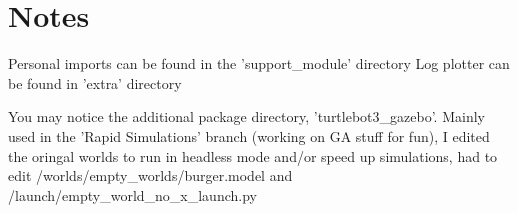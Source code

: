 \documentclass{article}
\begin{document}
    \pagebreak
    \section*{Notes}
    Personal imports can be found in the 'support\_module' directory \break
    Log plotter can be found in 'extra' directory \break

    You may notice the additional package directory, 'turtlebot3\_gazebo'. Mainly used in the 'Rapid Simulations' branch (working on GA stuff for fun), I edited the oringal worlds to run in headless mode and/or speed up simulations, had to edit /worlds/empty\_worlds/burger.model and /launch/empty\_world\_no\_x\_launch.py
\end{document}
